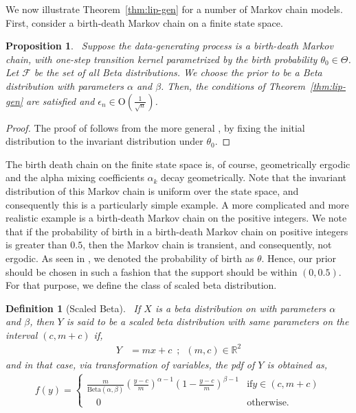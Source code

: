 \documentclass[11pt]{amsart}
\newtheorem{defn}{Definition}[section]
\newtheorem{proposition}{Proposition}[section]
\begin{document}
We now illustrate Theorem~\ref{thm:lip-gen} for a number of Markov chain models. First, consider a birth-death Markov chain on a finite state space. 
\begin{proposition}~\label{thm:bd}
Suppose the data-generating process is a birth-death Markov chain, with one-step transition kernel parametrized by the birth probability $\theta_0 \in \Theta$. Let $\mathcal{F}$ be the set of all Beta distributions. We choose the prior to be a Beta distribution with parameters $\alpha$ and $\beta$. Then, the conditions of Theorem~\ref{thm:lip-gen} are satisfied and $\epsilon_n\in\mathrm{O}\left(\frac{1}{\sqrt{n}}\right)$.
\end{proposition}
%
\begin{proof}
The proof of  follows from the more general , by fixing the initial distribution to the invariant distribution under $\theta_0$.
\end{proof}
%
The birth death chain on the finite state space is, of course, geometrically ergodic and the alpha mixing coefficients $\alpha_k$ decay geometrically. Note that the invariant distribution of this Markov chain is uniform over the state space, and consequently this is a particularly simple example. A more complicated and more realistic example is a birth-death Markov chain on the positive integers. We note that if the probability of birth in a birth-death Markov chain on positive integers is greater than $0.5$, then the Markov chain is transient, and consequently, not ergodic. As seen in , we denoted the probability of birth as $\theta$. Hence, our prior should be chosen in such a fashion that the support should be within $(0,0.5)$. For that purpose, we define the class of scaled beta distribution.
\begin{defn}[{Scaled Beta}]~\label{def:scaled-beta}
If $X$ is a beta distribution on with parameters $\alpha$ and $\beta$, then $Y$ is said to be a scaled beta distribution with same parameters on the interval $(c,m+c)$ if,
\begin{align*}
    Y & = mx+c\enspace ; \enspace (m,c)\in \mathbb{R}^2
\end{align*}
and in that case, via transformation of variables, the pdf of $Y$ is obtained as,
\begin{align*}
    f(y) = \begin{cases}
    \frac{m}{\mathrm{Beta}(\alpha,\beta)}\left(\frac{y-c}{m}\right)^{\alpha-1}\left(1-\frac{y-c}{m}\right)^{\beta-1} &  \mathrm{if} y\in (c,m+c)\\
    \quad 0 & \mathrm{otherwise}.
    \end{cases}
\end{align*}
\end{defn}
\end{document}
